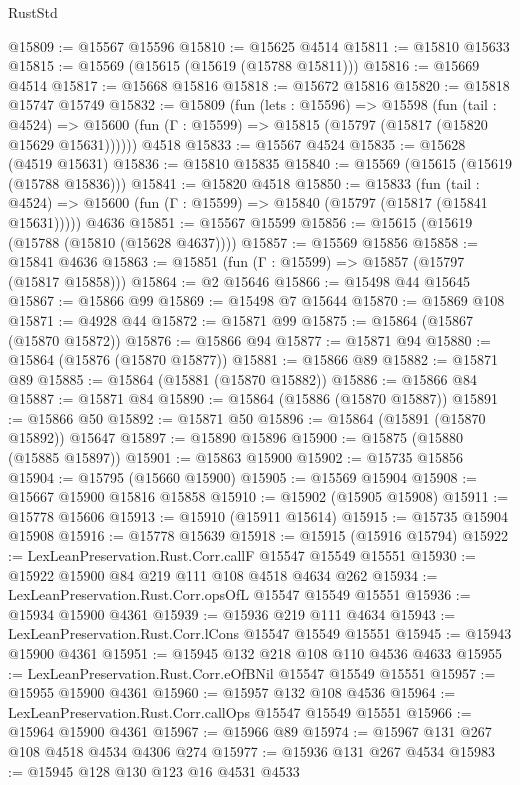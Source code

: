 \begin{lexlean}{RustStd}
\begin{coremodule}
@15809 := @15567 @15596
@15810 := @15625 @4514
@15811 := @15810 @15633
@15815 := @15569 (@15615 (@15619 (@15788 @15811)))
@15816 := @15669 @4514
@15817 := @15668 @15816
@15818 := @15672 @15816
@15820 := @15818 @15747 @15749
@15832 := @15809
    (fun (lets : @15596) =>
    @15598
      (fun (tail : @4524) =>
      @15600 (fun (Γ : @15599) => @15815 (@15797 (@15817 (@15820 @15629 @15631))))))
    @4518
@15833 := @15567 @4524
@15835 := @15628 (@4519 @15631)
@15836 := @15810 @15835
@15840 := @15569 (@15615 (@15619 (@15788 @15836)))
@15841 := @15820 @4518
@15850 := @15833
    (fun (tail : @4524) => @15600 (fun (Γ : @15599) => @15840 (@15797 (@15817 (@15841 @15631)))))
    @4636
@15851 := @15567 @15599
@15856 := @15615 (@15619 (@15788 (@15810 (@15628 @4637))))
@15857 := @15569 @15856
@15858 := @15841 @4636
@15863 := @15851 (fun (Γ : @15599) => @15857 (@15797 (@15817 @15858)))
@15864 := @2 @15646
@15866 := @15498 @44 @15645
@15867 := @15866 @99
@15869 := @15498 @7 @15644
@15870 := @15869 @108
@15871 := @4928 @44
@15872 := @15871 @99
@15875 := @15864 (@15867 (@15870 @15872))
@15876 := @15866 @94
@15877 := @15871 @94
@15880 := @15864 (@15876 (@15870 @15877))
@15881 := @15866 @89
@15882 := @15871 @89
@15885 := @15864 (@15881 (@15870 @15882))
@15886 := @15866 @84
@15887 := @15871 @84
@15890 := @15864 (@15886 (@15870 @15887))
@15891 := @15866 @50
@15892 := @15871 @50
@15896 := @15864 (@15891 (@15870 @15892)) @15647
@15897 := @15890 @15896
@15900 := @15875 (@15880 (@15885 @15897))
@15901 := @15863 @15900
@15902 := @15735 @15856
@15904 := @15795 (@15660 @15900)
@15905 := @15569 @15904
@15908 := @15667 @15900 @15816 @15858
@15910 := @15902 (@15905 @15908)
@15911 := @15778 @15606
@15913 := @15910 (@15911 @15614)
@15915 := @15735 @15904 @15908
@15916 := @15778 @15639
@15918 := @15915 (@15916 @15794)
@15922 := LexLeanPreservation.Rust.Corr.callF @15547 @15549 @15551
@15930 := @15922 @15900 @84 @219 @111 @108 @4518 @4634 @262
@15934 := LexLeanPreservation.Rust.Corr.opsOfL @15547 @15549 @15551
@15936 := @15934 @15900 @4361
@15939 := @15936 @219 @111 @4634
@15943 := LexLeanPreservation.Rust.Corr.lCons @15547 @15549 @15551
@15945 := @15943 @15900 @4361
@15951 := @15945 @132 @218 @108 @110 @4536 @4633
@15955 := LexLeanPreservation.Rust.Corr.eOfBNil @15547 @15549 @15551
@15957 := @15955 @15900 @4361
@15960 := @15957 @132 @108 @4536
@15964 := LexLeanPreservation.Rust.Corr.callOps @15547 @15549 @15551
@15966 := @15964 @15900 @4361
@15967 := @15966 @89
@15974 := @15967 @131 @267 @108 @4518 @4534 @4306 @274
@15977 := @15936 @131 @267 @4534
@15983 := @15945 @128 @130 @123 @16 @4531 @4533

\end{coremodule}
\end{lexlean}
